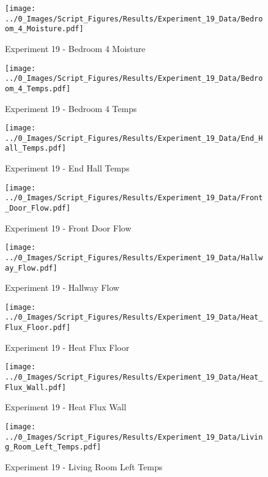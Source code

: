 	\clearpage

	\begin{figure}[H]
		\centering
		\texttt{[image: ../0\_Images/Script\_Figures/Results/Experiment\_19\_Data/Bedroom\_4\_Moisture.pdf]}
		\caption[]{Experiment 19 - Bedroom 4 Moisture}
	\end{figure}
 

	\begin{figure}[H]
		\centering
		\texttt{[image: ../0\_Images/Script\_Figures/Results/Experiment\_19\_Data/Bedroom\_4\_Temps.pdf]}
		\caption[]{Experiment 19 - Bedroom 4 Temps}
	\end{figure}
 
	\clearpage

	\begin{figure}[H]
		\centering
		\texttt{[image: ../0\_Images/Script\_Figures/Results/Experiment\_19\_Data/End\_Hall\_Temps.pdf]}
		\caption[]{Experiment 19 - End Hall Temps}
	\end{figure}
 

	\begin{figure}[H]
		\centering
		\texttt{[image: ../0\_Images/Script\_Figures/Results/Experiment\_19\_Data/Front\_Door\_Flow.pdf]}
		\caption[]{Experiment 19 - Front Door Flow}
	\end{figure}
 
	\clearpage

	\begin{figure}[H]
		\centering
		\texttt{[image: ../0\_Images/Script\_Figures/Results/Experiment\_19\_Data/Hallway\_Flow.pdf]}
		\caption[]{Experiment 19 - Hallway Flow}
	\end{figure}
 

	\begin{figure}[H]
		\centering
		\texttt{[image: ../0\_Images/Script\_Figures/Results/Experiment\_19\_Data/Heat\_Flux\_Floor.pdf]}
		\caption[]{Experiment 19 - Heat Flux Floor}
	\end{figure}
 
	\clearpage

	\begin{figure}[H]
		\centering
		\texttt{[image: ../0\_Images/Script\_Figures/Results/Experiment\_19\_Data/Heat\_Flux\_Wall.pdf]}
		\caption[]{Experiment 19 - Heat Flux Wall}
	\end{figure}
 

	\begin{figure}[H]
		\centering
		\texttt{[image: ../0\_Images/Script\_Figures/Results/Experiment\_19\_Data/Living\_Room\_Left\_Temps.pdf]}
		\caption[]{Experiment 19 - Living Room Left Temps}
	\end{figure}
 
